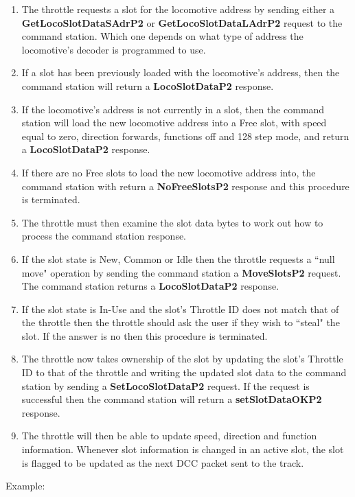\begin{enumerate}
\item The throttle requests a slot for the locomotive \gls{address} by sending either a \textbf{GetLocoSlotDataSAdrP2} or \textbf{GetLocoSlotDataLAdrP2} request to the command station. Which one depends on what type of address the locomotive's decoder is programmed to use. 
\item If a slot has been previously loaded with the locomotive's address, then the command station will return a \textbf{LocoSlotDataP2} response.
\item If the locomotive's address is not currently in a slot, then the command station will load the new locomotive address into a Free slot, with speed equal to zero, direction forwards, functions off and 128 step mode, and return a \textbf{LocoSlotDataP2} response.
\item If there are no Free slots to load the new locomotive address into, the command station with return a \textbf{NoFreeSlotsP2} response and this procedure is terminated.
\item The throttle must then examine the slot data bytes to work out how to process the command station response.
\item If the slot state is New, Common or Idle then the throttle requests a ``null move" operation by sending the command station a \textbf{MoveSlotsP2} request. The command station returns a \textbf{LocoSlotDataP2} response. 
\item If the slot state is In-Use and the slot's \gls{Throttle ID} does not match that of the throttle then the throttle should ask the user if they wish to ``steal" the slot. If the answer is no then this procedure is terminated.
\item The throttle now takes ownership of the slot by updating the slot's Throttle ID to that of the throttle and writing the updated slot data to the command station by sending a \textbf{SetLocoSlotDataP2} request. If the request is successful then the command station will return a \textbf{setSlotDataOKP2} response.
\item The throttle will then be able to update speed, direction and function information. Whenever slot information is changed in an active slot, the slot is flagged to be updated as the next DCC packet sent to the track.
\end{enumerate}

Example:


